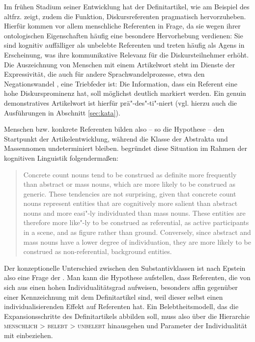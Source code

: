 Im frühen Stadium seiner Entwicklung hat der Definitartikel, wie \textcite{Epstein1993,Epstein1994} am Beispiel des altfrz.  zeigt, zudem die Funktion, Diskursreferenten pragmatisch hervorzuheben. Hierfür kommen vor allem menschliche Referenten in Frage, da sie wegen ihrer ontologischen Eigenschaften häufig eine besondere Hervorhebung verdienen: Sie sind kognitiv auffälliger als unbelebte Referenten und treten häufig als Agens in Erscheinung, was ihre kommunikative Relevanz für die Diskursteilnehmer erhöht. Die Auszeichnung von Menschen mit einem Artikelwort steht im Dienste der Expressivität, die auch für andere Sprachwandelprozesse, etwa den Negationswandel \parencite{Jager2008}, eine Triebfeder ist: Die Information, dass ein Referent eine hohe Diskursprominenz hat, soll möglichst deutlich markiert werden. Ein genuin demonstratives Artikelwort ist hierfür prä"-des"-ti"-niert (vgl. hierzu auch die Ausführungen in Abschnitt \ref{sec:kata}).

Menschen bzw. konkrete Referenten bilden also -- so die Hypothese -- den Startpunkt der Artikelentwicklung, während die Klasse der Abstrakta und Massennomen undeterminiert bleiben. \textcite{Epstein1994} begründet diese Situation im Rahmen der kognitiven Linguistik folgendermaßen: \blockcquote[71]{Epstein1994}{Concrete count nouns tend to be construed as definite more frequently than
abstract or mass nouns, which are more likely to be construed as generic.
These tendencies are not surprising, given that concrete count nouns represent
entities that are cognitively more salient than abstract nouns and more
easi"-ly individuated than mass nouns. These entities are therefore more
like"-ly to be construed as referential, as active participants in a scene, and as figure rather than ground. Conversely, since abstract and mass nouns have
a lower degree of individuation, they are more likely to be construed as
non-referential, background entities.} 

Der konzeptionelle Unterschied zwischen den Substantivklassen ist nach Epstein also eine Frage der . Man kann die Hypothese aufstellen, dass Referenten, die von sich aus einen hohen Individualitätsgrad aufweisen,  besonders affin gegenüber einer Kennzeichnung mit dem Definitartikel sind, weil dieser selbst einen individualisierenden Effekt auf Referenten hat. Ein Belebtheitsmodell, das die Expansionsschritte des Definitartikels abbilden soll, muss also über die Hierarchie \textsc{menschlich > belebt > unbelebt} hinausgehen und Parameter der Individualität mit einbeziehen. 

